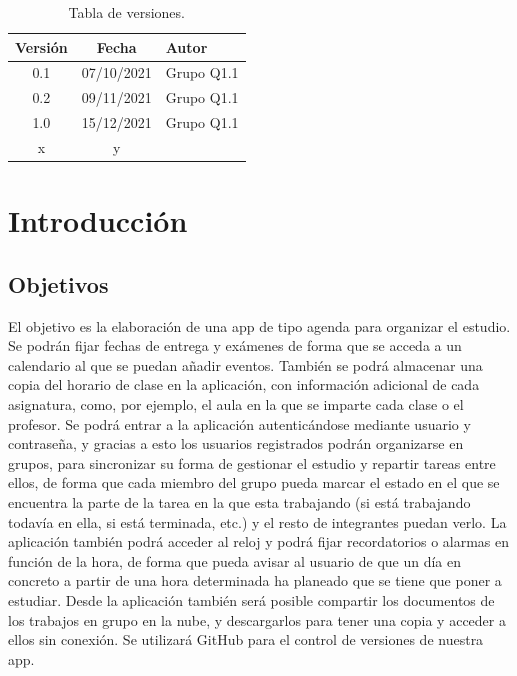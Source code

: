 \documentclass[a4paper,openright,12pt]{article}
\begin{document}

\tableofcontents

\vspace{5cm}

\begin{flushright}
\begin{table}[hbtp]
\begin{center}

\caption{Tabla de versiones.}
\label{tabla:versiones}
\small
\vspace{1ex}

\begin{tabular}{|c|c|l|}
\hline
Versión & Fecha & Autor \\
\hline \hline
0.1 & 07/10/2021 & Grupo Q1.1 \\ \hline
0.2 & 09/11/2021 & Grupo Q1.1 \\ \hline
1.0 & 15/12/2021 & Grupo Q1.1 \\ \hline
x & y & \\ \hline
\end{tabular}

\end{center}
\end{table}
\end{flushright}


\newpage
{}


\section{Introducción}\label{cap.introduccion}

\subsection{Objetivos}
El objetivo es la elaboración de una app de tipo agenda para organizar el estudio. Se podrán fijar fechas de entrega y exámenes de forma que se acceda a un calendario al que se puedan añadir eventos. También se podrá almacenar una copia del horario de clase en la aplicación, con información adicional de cada asignatura, como, por ejemplo, el aula en la que se imparte cada clase o el profesor. Se podrá entrar a la aplicación autenticándose mediante usuario y contraseña, y gracias a esto los usuarios registrados podrán organizarse en grupos, para sincronizar su forma de gestionar el estudio y repartir tareas entre ellos, de forma que cada miembro del grupo pueda marcar el estado en el que se encuentra la parte de la tarea en la que esta trabajando (si está trabajando todavía en ella, si está terminada, etc.) y el resto de integrantes puedan verlo. La aplicación también podrá acceder al reloj y podrá fijar recordatorios o alarmas en función de la hora, de forma que pueda avisar al usuario de que un día en concreto a partir de una hora determinada ha planeado que se tiene que poner a estudiar. Desde la aplicación también será posible compartir los documentos de los trabajos en grupo en la nube, y descargarlos para tener una copia y acceder a ellos sin conexión.
Se utilizará GitHub para el control de versiones de nuestra app. \cite{misc-git}
\end{document}

